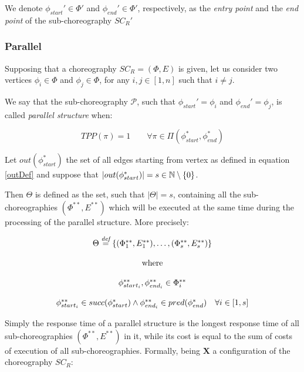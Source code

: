 We denote $\phi_{start}' \in \Phi'$ and $\phi_{end}' \in \Phi'$, respectively, as the \textit{entry point} and the \textit{end point} of the sub-choreography $SC_R'$

\subsubsection{Parallel}

Supposing that a choreography $SC_R = (\Phi,E)$ is given, let us consider two vertices $\phi_i \in \Phi$ and $\phi_j \in \Phi$, for any $i,j \in \left[ 1, n \right]$ such that $i \neq j$.

We say that the sub-choreography $\mathcal{P}$, such that $\phi_{start}' = \phi_i$ and $\phi_{end}' = \phi_j$, is called \textit{parallel structure} when:

\begin{equation}
	TPP(\pi) = 1 \qquad \forall \pi \in \Pi(\phi_{start}^*, \phi_{end}^*)
\end{equation}

Let $out(\phi_{start}^*)$ the set of all edges starting from vertex as defined in equation \ref{outDef} and suppose that $|out(\phi_{start}^*)| = s \in \mathbb{N} \setminus \left\lbrace 0 \right\rbrace $.

Then $\Theta$ is defined as the set, such that $|\Theta| = s$, containing all the sub-choreographies $(\Phi^{**}, E^{**})$ which will be executed at the same time during the processing of the parallel structure. More precisely:

\begin{equation}
	\begin{array}{c}
	\Theta \overset{\textit{def}}{=} \left\lbrace (\Phi^{**}_1, E^{**}_1), \ldots ,(\Phi^{**}_s, E^{**}_s) \right\rbrace \\\\
	\text{ where } \\\\
	\phi_{start_{i}}^{**}, \phi_{end_{i}}^{**} \in \Phi^{**}_i \\\\
	
	\phi_{start_{i}}^{**} \in succ(\phi_{start}^*) \wedge \phi_{end_{i}}^{**} \in pred (\phi_{end}^*) \quad \forall i \in \left[ 1, s \right]
	\end{array}
\end{equation} 

Simply the response time of a parallel structure is the longest response time of all
sub-choreographies $(\Phi^{**}, E^{**})$ in it, while its cost is equal to the sum of costs of execution of all sub-choreographies. Formally, being $\textbf{X}$ a configuration of the choreography $SC_R$:

